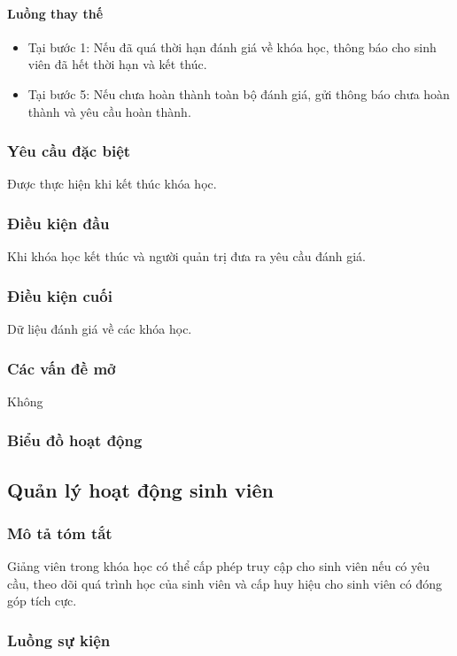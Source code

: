 \documentclass[./../main_file.tex]{subfiles}
\begin{document}
\paragraph{Luồng thay thế}
\begin{itemize}
	\item Tại bước 1: Nếu đã quá thời hạn đánh giá về khóa học, thông báo cho sinh viên đã hết thời hạn và kết thúc.
	\item Tại bước 5: Nếu chưa hoàn thành toàn bộ đánh giá, gửi thông báo chưa hoàn thành và yêu cầu hoàn thành.
	
\end{itemize}
\subsubsection{Yêu cầu đặc biệt}
Được thực hiện khi kết thúc khóa học.

\subsubsection{Điều kiện đầu}
Khi khóa học kết thúc và người quản trị đưa ra yêu cầu đánh giá.

\subsubsection{Điều kiện cuối}
Dữ liệu đánh giá về các khóa học.

\subsubsection{Các vấn đề mở}
Không

\subsubsection{Biểu đồ hoạt động}

\subsection{Quản lý hoạt động sinh viên}
\subsubsection{Mô tả tóm tắt}
Giảng viên trong khóa học có thể cấp phép truy cập cho sinh viên nếu có yêu cầu, theo dõi quá trình học của sinh viên và cấp huy hiệu cho sinh viên có đóng góp tích cực.

\subsubsection{Luồng sự kiện}
\end{document}
